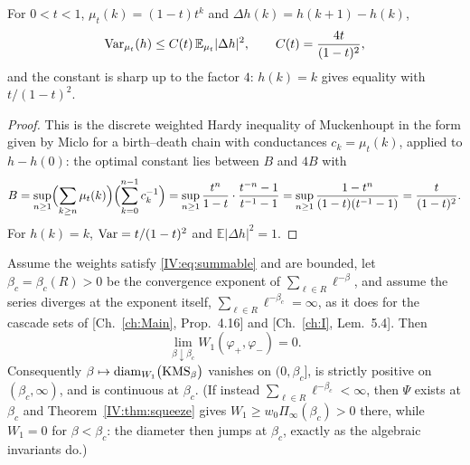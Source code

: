\begin{lemma}\label{IV:lem:poincare}
For $0<t<1$, $\mu_t(k)=(1-t)t^k$ and $\Delta h(k)=h(k+1)-h(k)$,
\begin{equation}\label{IV:eq:poincare}
\operatorname{Var}_{\mu_t}(h)\le C(t)\,\mathbb E_{\mu_t}|\Delta h|^2,\qquad C(t)=\frac{4t}{(1-t)^2},
\end{equation}
and the constant is sharp up to the factor $4$: $h(k)=k$ gives equality with $t/(1-t)^2$.
\end{lemma}

\begin{proof}
This is the discrete weighted Hardy inequality of Muckenhoupt \cite{Muck} in the form
given by Miclo \cite{Miclo} for a birth--death chain with conductances $c_k=\mu_t(k)$,
applied to $h-h(0)$: the optimal constant lies between $B$ and $4B$ with
\[
B=\sup_{n\ge1}\Bigl(\sum_{k\ge n}\mu_t(k)\Bigr)\Bigl(\sum_{k=0}^{n-1}c_k^{-1}\Bigr)
=\sup_{n\ge1}\frac{t^n}{1-t}\cdot\frac{t^{-n}-1}{t^{-1}-1}
=\sup_{n\ge1}\frac{1-t^n}{(1-t)(t^{-1}-1)}=\frac{t}{(1-t)^2}.
\]
For $h(k)=k$, $\operatorname{Var}=t/(1-t)^2$ and $\mathbb E|\Delta h|^2=1$.
\end{proof}

\begin{theorem}\label{IV:thm:continuous}
Assume the weights satisfy \eqref{IV:eq:summable} and are bounded, let $\beta_c=\beta_c(R)>0$
be the convergence exponent of $\sum_{\ell\in R}\ell^{-\beta}$, and assume the series
diverges at the exponent itself, $\sum_{\ell\in R}\ell^{-\beta_c}=\infty$, as it does for
the cascade sets of [Ch.~\ref{ch:Main}, Prop.~4.16] and [Ch.~\ref{ch:I}, Lem.~5.4]. Then
\[
\lim_{\beta\downarrow\beta_c}W_1(\varphi_+,\varphi_-)=0 .
\]
Consequently $\beta\mapsto\operatorname{diam}_{W_1}\bigl(\mathrm{KMS}_\beta\bigr)$ vanishes on
$(0,\beta_c]$, is strictly positive on $(\beta_c,\infty)$, and is continuous at $\beta_c$.
(If instead $\sum_{\ell\in R}\ell^{-\beta_c}<\infty$, then $\Psi$ exists at $\beta_c$ and
Theorem~\ref{IV:thm:squeeze} gives $W_1\ge w_0\Pi_\infty(\beta_c)>0$ there, while $W_1=0$ for
$\beta<\beta_c$: the diameter then jumps at $\beta_c$, exactly as the algebraic
invariants do.)
\end{theorem}

